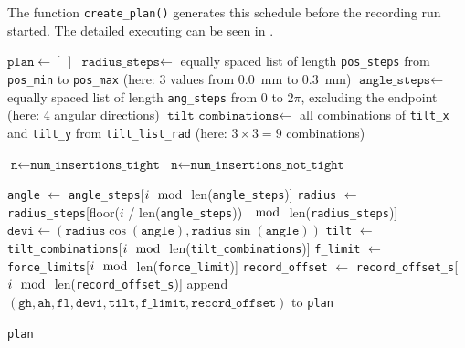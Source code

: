 The function \texttt{create\_plan()} generates this schedule before the recording run started. The detailed executing can be seen in .

\begin{algorithm}[htbp]
\caption{\texttt{create\_plan()} for systematic dataset generation}
\label{alg:create_plan}
\begin{algorithmic}[1]
\State $\texttt{plan} \gets [\ ]$
\State $\texttt{radius\_steps} \gets$ equally spaced list of length \texttt{pos\_steps} from \texttt{pos\_min} to \texttt{pos\_max} (here: 3 values from \SI{0.0}{\milli\meter} to \SI{0.3}{\milli\meter})
\State $\texttt{angle\_steps} \gets$ equally spaced list of length \texttt{ang\_steps} from \(0\) to \(2\pi\), excluding the endpoint (here: 4 angular directions)
\State $\texttt{tilt\_combinations} \gets$ all combinations of \texttt{tilt\_x} and \texttt{tilt\_y} from \texttt{tilt\_list\_rad} (here: \(3\times 3 = 9\) combinations)


                \State $\texttt{n} \gets \texttt{num\_insertions\_tight}$ 
            \Else
                \State $\texttt{n} \gets \texttt{num\_insertions\_not\_tight}$ 
            \EndIf

                \State \texttt{angle} $\gets$ \texttt{angle\_steps}[$i \mod$ len(\texttt{angle\_steps})]
                \State \texttt{radius} $\gets$ \texttt{radius\_steps}[floor($i$ / len(\texttt{angle\_steps})) $\mod$ len(\texttt{radius\_steps})]
                \State $\texttt{devi} \gets (\texttt{radius}\cos(\texttt{angle}),\texttt{radius}\sin(\texttt{angle}))$
                \State \texttt{tilt} $\gets$ \texttt{tilt\_combinations}[$i \mod$ len(\texttt{tilt\_combinations})]
                \State \texttt{f\_limit} $\gets$ \texttt{force\_limits}[$i \mod$ len(\texttt{force\_limit})]
                \State \texttt{record\_offset} $\gets$ \texttt{record\_offset\_s}[$i \mod$ len(\texttt{record\_offset\_s})]
                \State append $(\texttt{gh},\texttt{ah},\texttt{fl},\texttt{devi},\texttt{tilt},\texttt{f\_limit},\texttt{record\_offset})$ to \texttt{plan}
            \EndFor

        \EndFor
    \EndFor
\EndFor

\State \Return \texttt{plan}
\end{algorithmic}
\end{algorithm}

